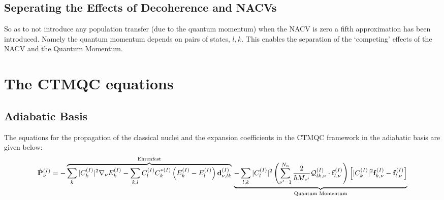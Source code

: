 \subsection{Seperating the Effects of Decoherence and NACVs}
So as to not introduce any population transfer (due to the quantum momentum) when the NACV is zero a fifth approximation has been introduced. Namely the quantum momentum depends on pairs of states, $l, k$. This enables the separation of the `competing' effects of the NACV and the Quantum Momentum.
\section{The CTMQC equations}
\subsection{Adiabatic Basis}
\label{sec:ad_eqns}
The equations for the propagation of the classical nuclei and the expansion coefficients in the CTMQC framework in the adiabatic basis are given below:
\begin{dmath}
  \dot{\mathbf{P}}_{\nu}^{(I)} =
  -\overbrace{
     \sum_{k} |C_{k}^{(I)}|^2 \nabla_{\nu}E_{k}^{(I)}
	 - \sum_{k,l} C_{l}^{(I)} C_{k}^{* (I)} \left(E_{k}^{(I)}  - E_{l}^{(I)}   \right) \mathbf{d}_{\nu, lk}^{(I)}
  }^{\text{Ehrenfest}}
  \\
  \underbrace{
    - \sum_{l,k} |C_{l}^{(I)}|^2 \left( \sum_{\nu'=1}^{N_n}    \frac{2}{\hbar M_{\nu'}} \mathcal{Q}_{lk, \nu}^{(I)} \cdot    \mathbf{f}_{l, \nu}^{(I)} \right)\left[ |C_{k}^{(I)}|^2    \mathbf{f}_{k,\nu}^{(I)} - \mathbf{f}_{l,\nu}^{(I)} \right]
  }_{\text{Quantum Momentum}}
    \label{eq:nuc_adiab}
\end{dmath}


